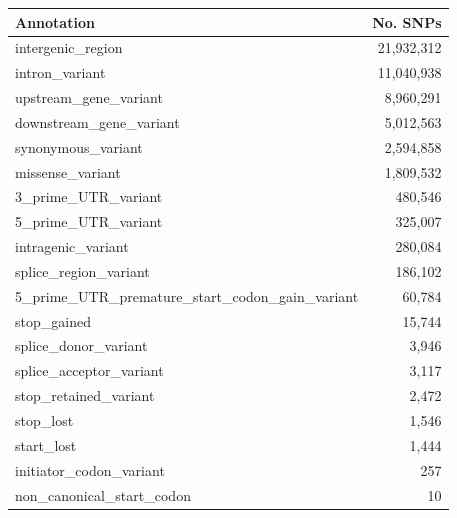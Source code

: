 \begin{refsection}
\begin{table}[h]
\begin{center}
\begin{threeparttable}
\begin{tabular}{lr}
 \hline
 \textbf{Annotation} & \textbf{No. SNPs} \\
 \hline
intergenic\_region & 21,932,312 \\
intron\_variant & 11,040,938 \\
upstream\_gene\_variant & 8,960,291 \\
downstream\_gene\_variant & 5,012,563 \\
synonymous\_variant & 2,594,858 \\
missense\_variant & 1,809,532 \\
3\_prime\_UTR\_variant & 480,546 \\
5\_prime\_UTR\_variant & 325,007 \\
intragenic\_variant & 280,084 \\
splice\_region\_variant & 186,102 \\
5\_prime\_UTR\_premature\_start\_codon\_gain\_variant & 60,784 \\
stop\_gained & 15,744 \\
splice\_donor\_variant & 3,946 \\
splice\_acceptor\_variant & 3,117 \\
stop\_retained\_variant & 2,472 \\
stop\_lost & 1,546 \\
start\_lost & 1,444 \\
initiator\_codon\_variant & 257 \\
non\_canonical\_start\_codon & 10 \\
 \hline
\end{tabular}

\end{threeparttable}
\end{center}
\end{table}


\printbibliography[
heading=subbibintoc,
title={References}
]


\end{refsection}
